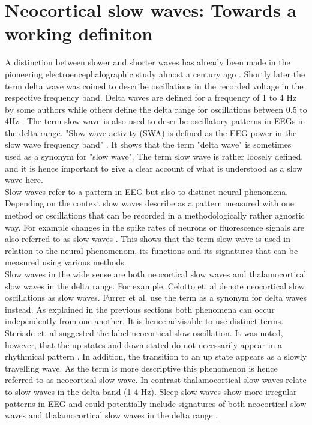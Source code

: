 \section{Neocortical slow waves: Towards a working definiton}
\label{working_definition}
A distinction between slower and shorter waves has already been made in the pioneering electroencephalographic study almost a century ago \parencite[p. 550]{berger1929}. Shortly later the term delta wave was coined to describe oscillations in the recorded voltage in the respective frequency band. Delta waves are defined for a frequency of 1 to 4 Hz by some authors \parencite{kubin2019interactions} while others define the delta range for oscillations between 0.5 to 4Hz \parencite{dossi1992electrophysiology}. The term slow wave is also used to describe oscillatory patterns in EEGs in the delta range. "Slow-wave activity (SWA) is defined as the EEG power in the slow wave frequency band" \parencite[p. 1]{furrer2019sleep}. It shows that the term "delta wave" is sometimes used as a synonym for "slow wave". The term slow wave is rather loosely defined, and it is hence important to give a clear account of what is understood as a slow wave here.\\
Slow waves refer to a pattern in EEG but also to distinct neural phenomena. Depending on the context slow waves describe as a pattern measured with one method or oscillations that can be recorded in a methodologically rather agnostic way. For example changes in the spike rates of neurons or fluorescence signals are also referred to as slow waves \parencite{jercog2017up, stroh2013making}. This shows that the term slow wave is used in relation to the neural phenomenom, its functions and its signatures that can be measured using various methods.\\
Slow waves in the wide sense are both neocortical slow waves and thalamocortical slow waves in the delta range. For example, Celotto et. al \parencite*{celotto2020analysis} denote neocortical slow oscillations as slow waves. Furrer et al. \parencite*{furrer2019sleep} use the term as a synonym for delta waves instead. As explained in the previous sections both phenomena can occur independently from one another. It is hence advisable to use distinct terms. Steriade et. al \parencite*{steriade1993novel} suggested the label neocortical slow oscillation. It was noted, however, that the up states and down stated do not necessarily appear in a rhythmical pattern \parencite{brown2012control}. In addition, the transition to an up state appears as a slowly travelling wave. As the term is more descriptive this phenomenon is hence referred to as neocortical slow wave. In contrast thalamocortical slow waves relate to slow waves in the delta band (1-4 Hz). Sleep slow waves show more irregular patterns in EEG and could potentially include signatures of both neocortical slow waves and thalamocortical slow waves in the delta range \parencite{steriade1993novel}.\\
